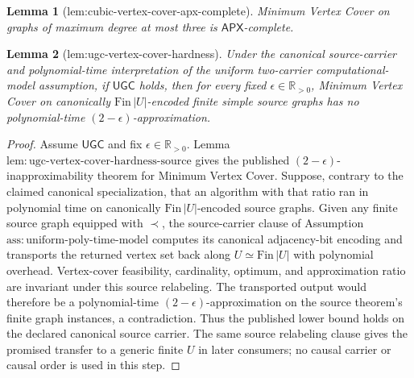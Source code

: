 \documentclass{article}
\newtheorem{lemma}{Lemma}
\begin{document}
\begin{lemma}[lem:cubic-vertex-cover-apx-complete]\label{lem:cubic-vertex-cover-apx-complete}
Minimum Vertex Cover on graphs of maximum degree at most three is \(\mathsf{APX}\)-complete.
\end{lemma}

\begin{lemma}[lem:ugc-vertex-cover-hardness]\label{lem:ugc-vertex-cover-hardness}
Under the canonical source-carrier and polynomial-time interpretation of the uniform two-carrier computational-model assumption, if \(\mathsf{UGC}\) holds, then for every fixed \(\epsilon\in\mathbb R_{>0}\), Minimum Vertex Cover on canonically \(\mathrm{Fin}\,|U|\)-encoded finite simple source graphs has no polynomial-time \((2-\epsilon)\)-approximation.
\end{lemma}
\begin{proof}
Assume \(\mathsf{UGC}\) and fix
\(\epsilon\in\mathbb R_{>0}\).  Lemma
\(\mathrm{lem{:}ugc\mbox{-}vertex\mbox{-}cover\mbox{-}hardness\mbox{-}source}\)
gives the published \((2-\epsilon)\)-inapproximability theorem for Minimum
Vertex Cover.  Suppose, contrary to the claimed canonical specialization,
that an algorithm with that ratio ran in polynomial time on canonically
\(\mathrm{Fin}\,|U|\)-encoded source graphs.  Given any finite source graph
equipped with \(\prec\), the source-carrier clause of Assumption
\(\mathrm{ass{:}uniform\mbox{-}poly\mbox{-}time\mbox{-}model}\) computes
its canonical adjacency-bit encoding and transports the returned vertex set
back along \(U\simeq\mathrm{Fin}\,|U|\) with polynomial overhead.
Vertex-cover feasibility, cardinality, optimum, and approximation ratio are
invariant under this source relabeling.  The transported output would
therefore be a polynomial-time \((2-\epsilon)\)-approximation on the source
theorem's finite graph instances, a contradiction.  Thus the published
lower bound holds on the declared canonical source carrier.  The same source
relabeling clause gives the promised transfer to a generic finite \(U\) in
later consumers; no causal carrier or causal order is used in this step.
\end{proof}
\end{document}
